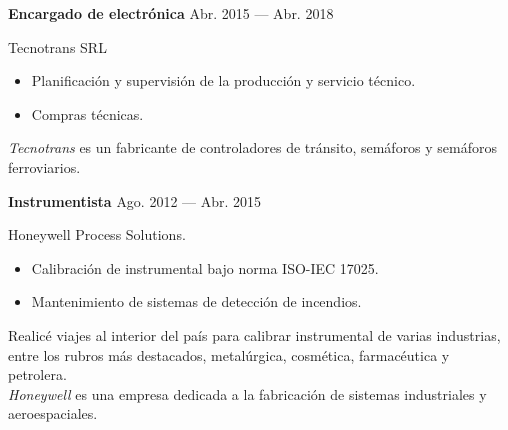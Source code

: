 \bigskip
\parbox[t][][t]{\linewidth}{
	{\parbox{\linewidth}{
		\parbox{\linewidth}{
			\textbf{Encargado de electrónica}
			\hfill
			{Abr. 2015 --- Abr. 2018}
		}
	}}
	\smallbreak
	\parbox{\linewidth}{Tecnotrans SRL}
	\smallbreak
	\begin{itemize}
	    \item{Planificación y supervisión de la producción y servicio técnico.}
	    \item{Compras técnicas.}
	\end{itemize}
	\smallbreak
	\emph{Tecnotrans} es un fabricante de controladores de tránsito, semáforos y semáforos ferroviarios.
}

\bigskip
\parbox[t][][t]{\linewidth}{
	{\parbox{\linewidth}{
		\parbox{\linewidth}{
			\textbf{Instrumentista}
			\hfill
			{Ago. 2012 --- Abr. 2015}
		}
	}}
	\smallbreak
	\parbox{\linewidth}{Honeywell Process Solutions.}
	\smallbreak
	\begin{itemize}
	    \item{Calibración de instrumental bajo norma ISO-IEC 17025.}
	    \item{Mantenimiento de sistemas de detección de incendios.}
	\end{itemize}
	\smallbreak
	Realicé viajes al interior del país para calibrar instrumental de varias industrias, entre los rubros más destacados, metalúrgica, cosmética, farmacéutica y petrolera.\\
    \emph{Honeywell} es una empresa dedicada a la fabricación de sistemas industriales y aeroespaciales.
}

